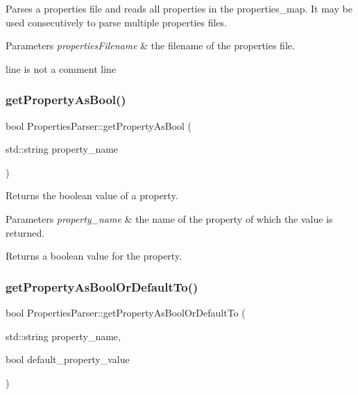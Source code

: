 Parses a properties file and reads all properties in the {\ttfamily properties\+\_\+map}. It may be used consecutively to parse multiple properties files.


\begin{DoxyParams}{Parameters}
{\em properties\+Filename} & the filename of the properties file. \\
\hline
\end{DoxyParams}
line is not a comment line \mbox{\label{class_properties_parser_a4d08af4f4c305273a64c281272011497}} 
\subsubsection{\texorpdfstring{get\+Property\+As\+Bool()}{getPropertyAsBool()}}
{\footnotesize\ttfamily bool Properties\+Parser\+::get\+Property\+As\+Bool (\begin{DoxyParamCaption}\item[{std\+::string}]{property\+\_\+name }\end{DoxyParamCaption})}

Returns the boolean value of a property.


\begin{DoxyParams}{Parameters}
{\em property\+\_\+name} & the name of the property of which the value is returned. \\
\hline
\end{DoxyParams}
\begin{DoxyReturn}{Returns}
a boolean value for the property. 
\end{DoxyReturn}
\mbox{\label{class_properties_parser_a8e5c2fd64020dd3a580457ca321179ec}} 
\subsubsection{\texorpdfstring{get\+Property\+As\+Bool\+Or\+Default\+To()}{getPropertyAsBoolOrDefaultTo()}}
{\footnotesize\ttfamily bool Properties\+Parser\+::get\+Property\+As\+Bool\+Or\+Default\+To (\begin{DoxyParamCaption}\item[{std\+::string}]{property\+\_\+name,  }\item[{bool}]{default\+\_\+property\+\_\+value }\end{DoxyParamCaption})}

